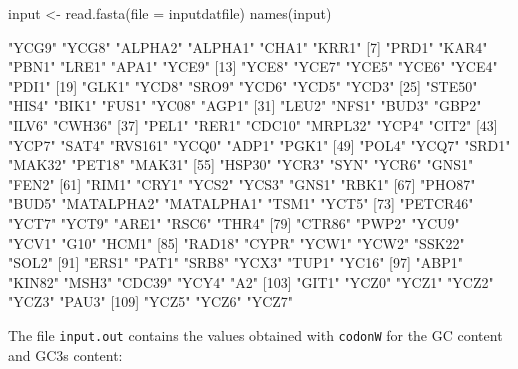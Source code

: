 \documentclass{article}
\begin{document}
\begin{Schunk}
\begin{Sinput}
 input <- read.fasta(file = inputdatfile)
 names(input)
\end{Sinput}
\begin{Soutput}
  [1] "YCG9"      "YCG8"      "ALPHA2"    "ALPHA1"    "CHA1"      "KRR1"     
  [7] "PRD1"      "KAR4"      "PBN1"      "LRE1"      "APA1"      "YCE9"     
 [13] "YCE8"      "YCE7"      "YCE5"      "YCE6"      "YCE4"      "PDI1"     
 [19] "GLK1"      "YCD8"      "SRO9"      "YCD6"      "YCD5"      "YCD3"     
 [25] "STE50"     "HIS4"      "BIK1"      "FUS1"      "YC08"      "AGP1"     
 [31] "LEU2"      "NFS1"      "BUD3"      "GBP2"      "ILV6"      "CWH36"    
 [37] "PEL1"      "RER1"      "CDC10"     "MRPL32"    "YCP4"      "CIT2"     
 [43] "YCP7"      "SAT4"      "RVS161"    "YCQ0"      "ADP1"      "PGK1"     
 [49] "POL4"      "YCQ7"      "SRD1"      "MAK32"     "PET18"     "MAK31"    
 [55] "HSP30"     "YCR3"      "SYN"       "YCR6"      "GNS1"      "FEN2"     
 [61] "RIM1"      "CRY1"      "YCS2"      "YCS3"      "GNS1"      "RBK1"     
 [67] "PHO87"     "BUD5"      "MATALPHA2" "MATALPHA1" "TSM1"      "YCT5"     
 [73] "PETCR46"   "YCT7"      "YCT9"      "ARE1"      "RSC6"      "THR4"     
 [79] "CTR86"     "PWP2"      "YCU9"      "YCV1"      "G10"       "HCM1"     
 [85] "RAD18"     "CYPR"      "YCW1"      "YCW2"      "SSK22"     "SOL2"     
 [91] "ERS1"      "PAT1"      "SRB8"      "YCX3"      "TUP1"      "YC16"     
 [97] "ABP1"      "KIN82"     "MSH3"      "CDC39"     "YCY4"      "A2"       
[103] "GIT1"      "YCZ0"      "YCZ1"      "YCZ2"      "YCZ3"      "PAU3"     
[109] "YCZ5"      "YCZ6"      "YCZ7"     
\end{Soutput}
\end{Schunk}

The file \texttt{input.out} contains the values obtained with \texttt{codonW}
for the GC content and GC3s content:
\end{document}
